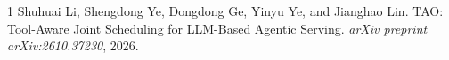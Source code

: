 \documentclass[11pt,a4paper]{article}
\begin{document}

\begin{thebibliography}{1}
Shuhuai Li, Shengdong Ye, Dongdong Ge, Yinyu Ye, and Jianghao Lin.
\newblock TAO: Tool-Aware Joint Scheduling for LLM-Based Agentic Serving.
\newblock \emph{arXiv preprint arXiv:2610.37230}, 2026.
\end{thebibliography}
\end{document}
